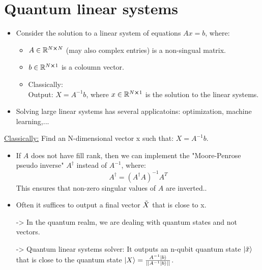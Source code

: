 \documentclass[11.5pt, paper=a4]{article}
\theoremstyle{definition}
\numberwithin{theorem}{section}
\begin{document}
\section{Quantum linear systems}
\begin{itemize}
    \item Consider the solution to a linear system of equations $Ax=b$, where:
    \begin{itemize}
        \item $A \in \mathbb{R}^{N\cross N}$ (may also complex entries) is a non-singual matrix.
        \item $b \in \mathbb{R}^{N\cross 1}$ is a coloumn vector.
        \item Classically: \\
        Output: $X=A^{-1}b$, where $x \in \mathbb{R}^{N\cross 1}$ is the solution to the linear systems.
    \end{itemize}
    \item Solving large linear systems has several applicatoins: optimization, machine learning,...
\end{itemize}
\underline{Classically:} Find an N-dimensional vector x such that: $X=A^{-1}b$.
\begin{itemize}
    \item If $A$ does not have fill rank, then we can implement the "Moore-Penrose pseudo inverse" $A^{\dagger}$ instead of $A^{-1}$, where:
    $$ A^{\dagger} = (A^{\dagger}A)^{-1} A^{T}$$
    This ensures that non-zero singular values of $A$ are inverted..
    \item Often it suffices to output a final vector $\Tilde{X}$ that is close to x.
\end{itemize}
\begin{itemize}
    \item[->] In the quantum realm, we are dealing with quantum states and not vectors.
    \item[->] Quantum linear systems solver: It outputs an n-qubit quantum state $\ket{\Tilde{x}}$ that is close to the quantum state $\ket{X} = \frac{A^{-1}\ket{b}}{||A^{-1}\ket{b}||}$.
\end{itemize}
\end{document}
